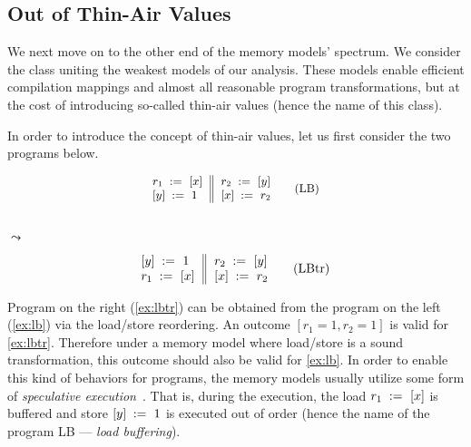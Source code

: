 \subsection{Out of Thin-Air Values}
\label{sec:analysis:oota}

We next move on to the other end of the memory models' spectrum. 
We consider the class uniting the weakest models of our analysis.
These models enable efficient compilation mappings and 
almost all reasonable program transformations, but at the cost of 
introducing so-called thin-air values (hence the name of this class).

In order to introduce the concept of thin-air values, 
let us first consider the two programs below. 

\begin{minipage}{0.43\linewidth}
\begin{equation*}
\small
\inarrII{
  \readInst{}{r_1}{x}     \\
  \writeInst{}{y}{1}      \\
}{
  \readInst{}{r_2}{y}     \\
  \writeInst{}{x}{r_2}    \\
}
\tag{LB}\label{ex:lb}
\end{equation*}
\end{minipage}\hfill%
\begin{minipage}{0.09\linewidth}
\Large~\\ $\leadsto$
\end{minipage}\hfill%
\begin{minipage}{0.43\linewidth}
\begin{equation*}
\inarrII{
  \writeInst{}{y}{1}      \\
  \readInst{}{r_1}{x}     \\
}{
  \readInst{}{r_2}{y}     \\
  \writeInst{}{x}{r_2}    \\
}
\tag{LBtr}\label{ex:lbtr}
\end{equation*}
\end{minipage}

Program on the right (\ref{ex:lbtr}) can be obtained 
from the program on the left (\ref{ex:lb})
via the load/store reordering.
An outcome $[r_1=1, r_2=1]$ is valid for \ref{ex:lbtr}.
Therefore under a memory model where load/store is a sound transformation, 
this outcome should also be valid for \ref{ex:lb}.
In order to enable this kind of behaviors for programs, 
the memory models usually utilize some form of 
\emph{speculative execution}~\cite{Boudol-Petri:ESOP10, Crary-Sullivan:POPL15}.
That is, during the execution, the load $r_1\;:=_{}\;[x]$
is buffered and store $[y]\;:=_{}\;1$ is executed out of order
(hence the name of the program LB --- \emph{load buffering}).

